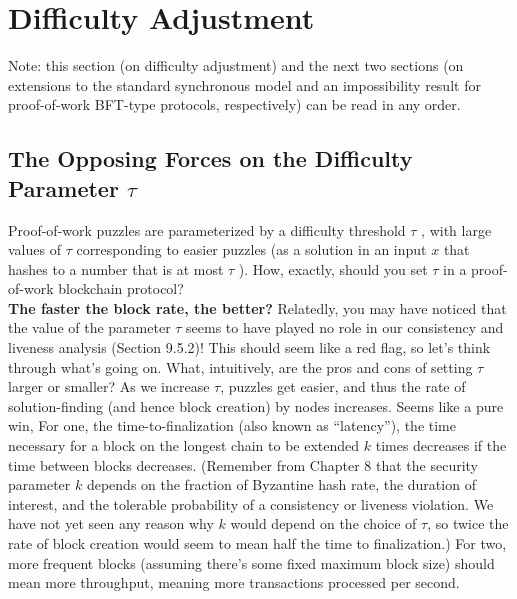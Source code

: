 \section{Difficulty Adjustment}
Note: this section (on difficulty adjustment) and the next two sections (on extensions to
the standard synchronous model and an impossibility result for proof-of-work BFT-type
protocols, respectively) can be read in any order.
\subsection{The Opposing Forces on the Difficulty Parameter $\tau$}

Proof-of-work puzzles are parameterized by a difficulty threshold $\tau$ , with large values of $\tau$
corresponding to easier puzzles (as a solution in an input $x$ that hashes to a number that is
at most $\tau$ ). How, exactly, should you set $\tau$ in a proof-of-work blockchain protocol?\\

\noindent
\textbf{The faster the block rate, the better?} Relatedly, you may have noticed that the value
of the parameter $\tau$ seems to have played no role in our consistency and liveness analysis (Section 9.5.2)! This should seem like a red flag, so let’s think through what’s going on.
What, intuitively, are the pros and cons of setting $\tau$ larger or smaller? As we increase $\tau$,
puzzles get easier, and thus the rate of solution-finding (and hence block creation) by nodes
increases. Seems like a pure win, For one, the time-to-finalization (also known as “latency”),
the time necessary for a block on the longest chain to be extended $k$ times decreases if the
time between blocks decreases. (Remember from Chapter 8 that the security parameter $k$ depends on the fraction of Byzantine hash rate, the duration of interest, and the tolerable
probability of a consistency or liveness violation. We have not yet seen any reason why $k$ would depend on the choice of $\tau$, so twice the rate of block creation would seem to mean
half the time to finalization.) For two, more frequent blocks (assuming there’s some fixed
maximum block size) should mean more throughput, meaning more transactions processed
per second.\\

